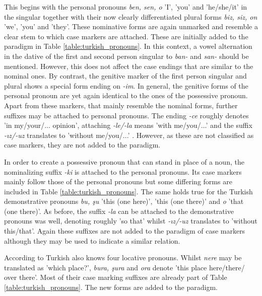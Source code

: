 \documentclass[11pt,a4paper,twoside,openright]{scrbook}
\begin{document}
This begins with the personal pronouns \foreignlanguage{turkish}{\textit{ben, sen, o}} 'I', 'you' and 'he/she/it' in the singular together with their now clearly differentiated plural forms \foreignlanguage{turkish}{\textit{biz, siz, on}} 'we', 'you' and 'they'. These nominative forms are again unmarked and resemble a clear stem to which case markers are attached. These are initially added to the paradigm in Table \ref{table:turkish_pronouns}. In this context, a vowel alternation in the dative of the first and second person singular to \foreignlanguage{turkish}{\textit{ban-} and \textit{san-}} should be mentioned. However, this does not affect the case endings that are similar to the nominal ones.  By contrast, the genitive marker of the first person singular and plural shows a special form ending on \foreignlanguage{turkish}{\textit{-im}}. In general, the genitive forms of the personal pronoun are yet again identical to the ones of the possessive pronoun. Apart from these markers, that mainly resemble the nominal forms, further suffixes may be attached to personal pronouns. The ending \foreignlanguage{turkish}{\textit{-ce}} roughly denotes 'in my/your/... opinion', attaching \foreignlanguage{turkish}{\textit{-le/-la}} means 'with me/you/...' and the suffix \foreignlanguage{turkish}{\textit{-ız/-uz}} translates to 'without me/you/...' \citep{ersenrasch2012tuer}. However, as these are not classified as case markers, they are not added to the paradigm.

In order to create a possessive pronoun that can stand in place of a noun, the nominalizing suffix \foreignlanguage{turkish}{\textit{-ki}} is attached to the personal pronouns. Its case markers mainly follow those of the personal pronouns but some differing forms are included in Table \ref{table:turkish_pronouns}. The same holds true for the Turkish demonstrative pronouns \foreignlanguage{turkish}{\textit{bu, şu} 'this (one here)', 'this (one there)' and \textit{o}} 'that (one there)'. As before, the suffix \foreignlanguage{turkish}{\textit{-la}} can be attached to the demonstrative pronouns was well, denoting roughly 'so that' whilst \foreignlanguage{turkish}{\textit{-ız/-uz}} translates to 'without this/that'. Again these suffixes are not added to the paradigm of case markers although they may be used to indicate a similar relation.

According to \citet{ersenrasch2012tuer} Turkish also knows four locative pronouns. Whilst \foreignlanguage{turkish}{\textit{nere}} may be translated as 'which place?', \foreignlanguage{turkish}{\textit{bura, şura} and \textit{ora}} denote 'this place here/there/ over there'. Most of their case marking suffixes are already part of Table \ref{table:turkish_pronouns}. The new forms are added to the paradigm. 
\end{document}
